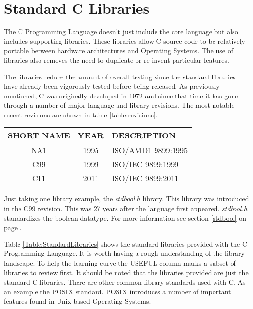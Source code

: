 \section{Standard C Libraries}

The C Programming Language doesn't just include the core language but also includes supporting libraries. These libraries allow C source code to be relatively portable between hardware architectures and Operating Systems. The use of libraries also removes the need to duplicate or re-invent particular features. 

The libraries reduce the amount of overall testing since the standard libraries have already been vigorously tested before being released. As previously mentioned, C was originally developed in 1972 and since that time it has gone through a number of major language and library revisions. The most notable recent revisions are shown in table \ref{table:revisions}.\\ 


\begin{table*}[ht]
\centering
  \begin{tabular}{ | c | c | l |}
    \hline
    SHORT NAME & YEAR & DESCRIPTION \\ \hline
    NA1 & 1995 & ISO/AMD1 9899:1995  \\ \hline
    C99 & 1999 & ISO/IEC 9899:1999  \\ \hline
    C11 & 2011 & ISO/IEC 9899:2011  \\ \hline  
  \end{tabular}
\caption{Revision history}
\label{table:revisions}
\end{table*}

Just taking one library example, the \textit{stdbool.h} library. This library was introduced in the C99 revision. This was 27 years after the language first appeared. \textit{stdbool.h} standardizes the boolean datatype. For more information see section \ref{stdbool} on page \pageref{stdbool}. 

\clearpage

Table \ref{Table:StandardLibraries} shows the standard libraries provided with the C Programming Language. It is worth having a rough understanding of the library landscape. To help the learning curve the USEFUL column marks a subset of libraries to review first. It should be noted that the libraries provided are just the standard C libraries. There are other common library standards used with C. As an example the POSIX standard. POSIX introduces a number of important features found in Unix based Operating Systems.\\

